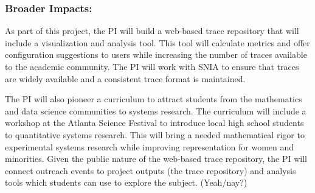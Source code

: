 
\subsubsection*{Broader Impacts: }
As part of this project, the PI will build a 
web-based trace repository that will include a visualization and analysis tool. This tool will calculate metrics and
offer configuration suggestions to users while increasing the number
of traces available to the academic community.  The PI will work with SNIA to ensure that traces are widely available and a consistent trace format is maintained.

The PI will also pioneer a curriculum to attract students from the mathematics and data science communities to systems research. The curriculum will include a workshop at the Atlanta Science Festival to introduce local high school students to quantitative systems research.  This will bring a needed mathematical rigor to experimental systems research while improving representation for women and minorities.%
Given the public nature of the web-based trace repository, the PI will connect outreach events to project outputs (the trace repository) and analysis tools which students can use to explore the subject. (Yeah/nay?) 




